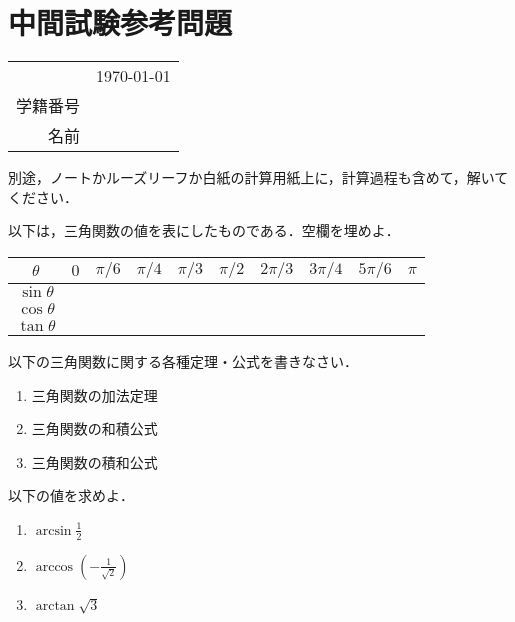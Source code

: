 \section*{中間試験参考問題}
\begin{table}[!t]
	\begin{flushright}
		\begin{tabular}{rc}
			& \usdate\today \\
			学籍番号 & \\
			名前 & \\
		\end{tabular}
	\end{flushright}
\end{table}
別途，ノートかルーズリーフか白紙の計算用紙上に，計算過程も含めて，解いてください．

\begin{question}
	以下は，三角関数の値を表にしたものである．空欄を埋めよ．
\end{question}
\begin{table}[!h]
	\centering
	\begin{tabular}{c|ccccccccc}
		$\theta$ & $0$ & $\pi/6$ & $\pi/4$ & $\pi/3$ & $\pi/2$ & $2\pi/3$ & $3\pi/4$ & $5\pi/6$ & $\pi$ \\
		\hline
		$\sin\theta$ & & & & & & & & & \\
		$\cos\theta$ & & & & & & & & & \\
		$\tan\theta$ & & & & & & & & & \\
	\end{tabular}
\end{table}

\begin{question}
	以下の三角関数に関する各種定理・公式を書きなさい．
	\begin{enumerate}[itemsep=2ex, label*=(\arabic*)]
		\item 三角関数の加法定理
		\item 三角関数の和積公式
		\item 三角関数の積和公式
	\end{enumerate}
\end{question}

\begin{question}
	以下の値を求めよ．
	\begin{enumerate}[itemsep=2ex, label*=(\arabic*)]
		\item $\displaystyle \arcsin\frac{1}{2}$
		\item $\displaystyle \arccos\left(-\frac{1}{\sqrt{2}}\right)$
		\item $\displaystyle \arctan\sqrt{3}$
	\end{enumerate}
\end{question}

